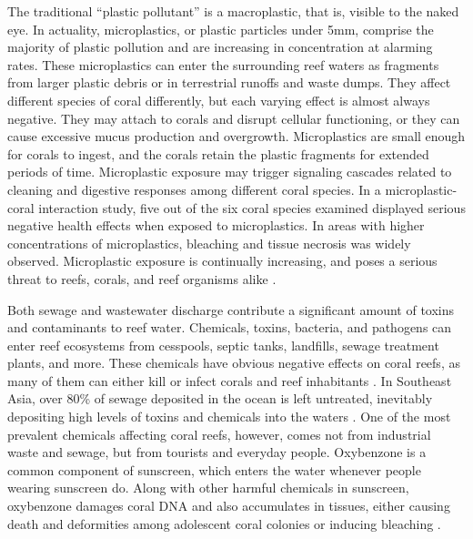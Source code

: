 \documentclass{book}\usepackage{knitr}
\begin{document}
The traditional ``plastic pollutant'' is a macroplastic, that is, visible to the naked eye. In actuality, microplastics, or plastic particles under 5mm, comprise the majority of plastic pollution and are increasing in concentration at alarming rates. These microplastics can enter the surrounding reef waters as fragments from larger plastic debris or in terrestrial runoffs and waste dumps. They affect different species of coral differently, but each varying effect is almost always negative. They may attach to corals and disrupt cellular functioning, or they can cause excessive mucus production and overgrowth. Microplastics are small enough for corals to ingest, and the corals retain the plastic fragments for extended periods of time. Microplastic exposure may trigger signaling cascades related to cleaning and digestive responses among different coral species. In a microplastic-coral interaction study, five out of the six coral species examined displayed serious negative health effects when exposed to microplastics. In areas with higher concentrations of microplastics, bleaching and tissue necrosis was widely observed. Microplastic exposure is continually increasing, and poses a serious threat to reefs, corals, and reef organisms alike \citep{12907334620180601}.

Both sewage and wastewater discharge contribute a significant amount of toxins and contaminants to reef water. Chemicals, toxins, bacteria, and pathogens can enter reef ecosystems from cesspools, septic tanks, landfills, sewage treatment plants, and more. These chemicals have obvious negative effects on coral reefs, as many of them can either kill or infect corals and reef inhabitants \citep{coralreefalliance_2021}. In Southeast Asia, over 80\% of sewage deposited in the ocean is left untreated, inevitably depositing high levels of toxins and chemicals into the waters \citep{4884777420100401}. One of the most prevalent chemicals affecting coral reefs, however, comes not from industrial waste and sewage, but from tourists and everyday people. Oxybenzone is a common component of sunscreen, which enters the water whenever people wearing sunscreen do. Along with other harmful chemicals in sunscreen, oxybenzone damages coral DNA and also accumulates in tissues, either causing death and deformities among adolescent coral colonies or inducing bleaching \citep{USEPA_2017}.
\end{document}
